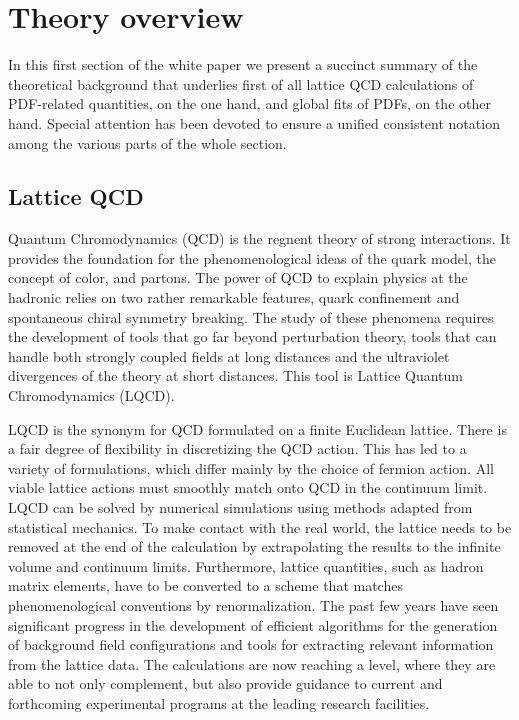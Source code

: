 
\section{Theory overview}
\label{sec:theoryoverview}

In this first section of the white paper we present a succinct
summary of the theoretical background that underlies
first of all lattice QCD calculations of PDF-related
quantities, on the one hand, and global fits
of PDFs, on the other hand.
%
Special attention has been devoted to ensure a unified
consistent notation among the various parts of the whole section.

\subsection{Lattice QCD}

\label{Sec:IntroLQCD}

Quantum Chromodynamics (QCD) is the regnent theory of strong interactions. It provides the foundation 
for the phenomenological ideas of the quark model, the concept of color, and partons. 
The power of QCD to explain physics at the hadronic relies on two rather remarkable features,
quark confinement and spontaneous chiral symmetry breaking. The study
of these phenomena requires the development of tools that go far
beyond perturbation theory, tools that can handle both strongly
coupled fields at long distances and the ultraviolet divergences of
the theory at short distances. This tool is Lattice Quantum
Chromodynamics (LQCD).

LQCD is the synonym for QCD formulated on a finite Euclidean
lattice. There is a fair degree of flexibility in discretizing the QCD
action. This has led to a variety of formulations, which differ mainly
by the choice of fermion action. All viable lattice actions must
smoothly match onto QCD in the continuum limit. LQCD can be solved by
numerical simulations using methods adapted from statistical
mechanics. To make contact with the real world, the lattice needs to
be removed at the end of the calculation by extrapolating the results
to the infinite volume and continuum limits. Furthermore, lattice
quantities, such as hadron matrix elements, have to be converted to a
scheme that matches phenomenological conventions by
renormalization. The past few years have seen significant progress in
the development of efficient algorithms for the generation of
background field configurations and tools for extracting relevant
information from the lattice data. The calculations are now reaching a
level, where they are able to not only complement, but also provide
guidance to current and forthcoming experimental programs at the
leading research facilities.



